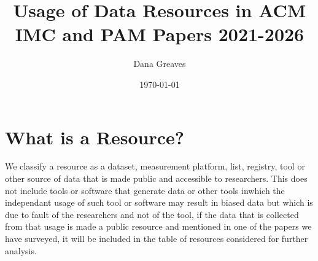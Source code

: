 \documentclass[11pt,a4paper]{article}
\title{Usage of Data Resources in ACM IMC and PAM Papers 2021-2026}
\author{Dana Greaves}
\date{\today}
\begin{document}
\maketitle

\tableofcontents
\newpage

\section{What is a Resource?}

We classify a resource as a dataset, measurement platform, list, registry, tool or other source of data that is made public and accessible to researchers. This does not include tools or software that generate data or other tools inwhich the independant usage of such tool or software may result in biased data but which is due to fault of the researchers and not of the tool, if the data that is collected from that usage is made a public resource and mentioned in one of the papers we have surveyed, it will be included in the table of resources considered for further analysis. 
\end{document}

